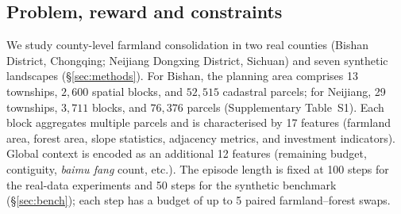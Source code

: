 \documentclass[11pt]{article}
\begin{document}
\subsection{Problem, reward and constraints}\label{sec:methods-action}

We study county-level farmland consolidation in two real counties (Bishan District, Chongqing; Neijiang Dongxing District, Sichuan) and seven synthetic landscapes (\S\ref{sec:methods}). For Bishan, the planning area comprises 13 townships, $2{,}600$ spatial blocks, and $52{,}515$ cadastral parcels; for Neijiang, 29 townships, $3{,}711$ blocks, and $76{,}376$ parcels (Supplementary Table~S1). Each block aggregates multiple parcels and is characterised by 17 features (farmland area, forest area, slope statistics, adjacency metrics, and investment indicators). Global context is encoded as an additional 12 features (remaining budget, contiguity, \textit{baimu fang} count, etc.). The episode length is fixed at 100 steps for the real-data experiments and 50 steps for the synthetic benchmark (\S\ref{sec:bench}); each step has a budget of up to 5 paired farmland--forest swaps.
\end{document}
